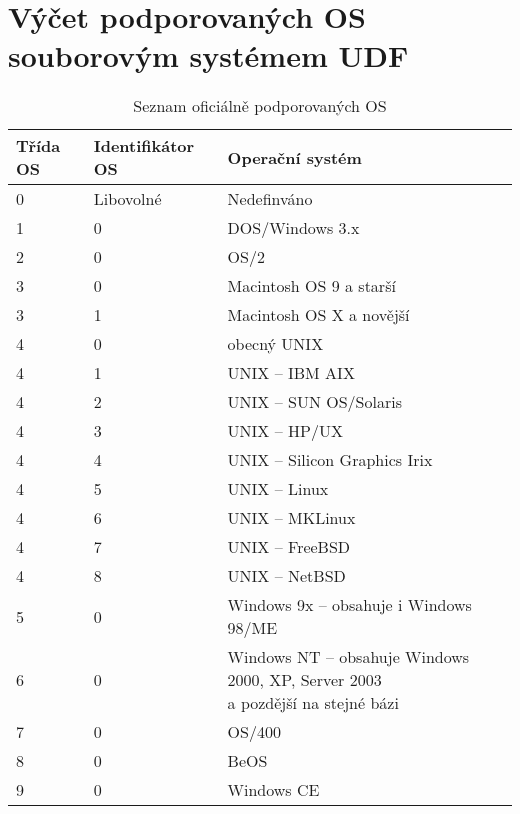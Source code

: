 \chapter{Výčet podporovaných OS souborovým systémem UDF}
\label{ch:podpora}
\begin{table}[h]
    \centering
    \begin{tabular}{ | l | l | l | }
        \hline
        Třída OS& Identifikátor OS  & Operační systém  \\ \hline\hline
        0       & Libovolné         & Nedefinváno \\ \hline 
        1       & 0                 & DOS/Windows 3.x\\ \hline 
        2       & 0                 & OS/2\\ \hline 
        3       & 0                 & Macintosh OS 9 a starší\\ \hline 
        3       & 1                 & Macintosh OS X a novější\\ \hline 
        4       & 0                 & obecný UNIX\\ \hline 
        4       & 1                 & UNIX -- IBM AIX\\ \hline 
        4       & 2                 & UNIX -- SUN OS/Solaris\\ \hline 
        4       & 3                 & UNIX -- HP/UX\\ \hline 
        4       & 4                 & UNIX -- Silicon Graphics Irix\\ \hline 
        4       & 5                 & UNIX -- Linux\\ \hline 
        4       & 6                 & UNIX -- MKLinux\\ \hline 
        4       & 7                 & UNIX -- FreeBSD\\ \hline 
        4       & 8                 & UNIX -- NetBSD\\ \hline 
        5       & 0                 & Windows 9x -- obsahuje i Windows 98/ME\\ \hline 
        6       & 0                 & \makecell{Windows NT -- obsahuje Windows 2000, XP, Server 2003\\ a pozdější na stejné bázi}\\ \hline 
        7       & 0                 & OS/400\\ \hline 
        8       & 0                 & BeOS\\ \hline 
        9       & 0                 & Windows CE\\ \hline 
    \end{tabular}
    \caption{Seznam oficiálně podporovaných OS\label{tab:os-types}}
\end{table}

